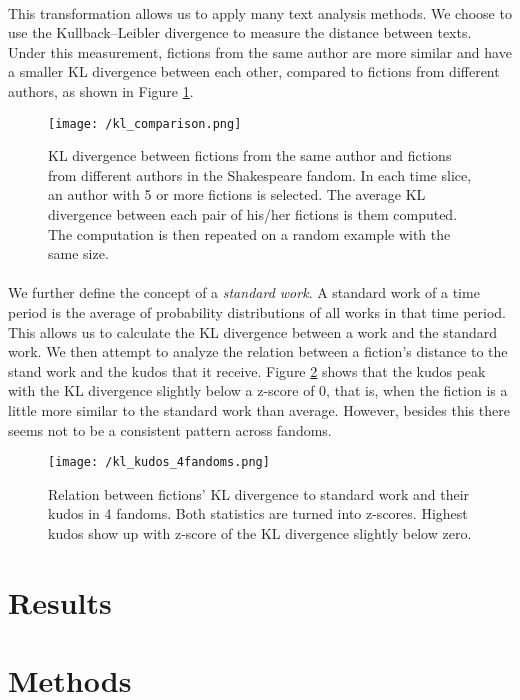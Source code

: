 \documentclass[11pt]{article} %
\begin{document}
\paragraph{} This transformation allows us to apply many text analysis methods. We choose to use the Kullback--Leibler divergence to measure the distance between texts. Under this measurement, fictions from the same author are more similar and have a smaller KL divergence between each other, compared to fictions from different authors, as shown in Figure \ref{fig:kl_comp}.


\begin{figure}[htbp]
\begin{center}
\texttt{[image: /kl\_comparison.png]}
\caption{KL divergence between fictions from the same author and fictions from different authors in the Shakespeare fandom. In each time slice, an author with 5 or more fictions is selected. The average KL divergence between each pair of his/her fictions is them computed. The computation is then repeated on a random example with the same size. }
\label{fig:kl_comp}
\end{center}
\end{figure}

\paragraph{} We further define the concept of a \emph{standard work}. A standard work of a time period is the average of probability distributions of all works in that time period. This allows us to calculate the KL divergence between a work and the standard work. We then attempt to analyze the relation between a fiction's distance to the stand work and the kudos that it receive. Figure \ref{fig:kl_kudos} shows that the kudos peak with the KL divergence slightly below a z-score of 0, that is, when the fiction is a little more similar to the standard work than average. However, besides this there seems not to be a consistent pattern across fandoms.

\begin{figure}[htbp]
\begin{center}
\texttt{[image: /kl\_kudos\_4fandoms.png]}
\caption{Relation between fictions' KL divergence to standard work and their kudos in 4 fandoms. Both statistics are turned into z-scores. Highest kudos show up with z-score of the KL divergence slightly below zero.}
\label{fig:kl_kudos}
\end{center}
\end{figure}






\section{Results} %
\label{sec:results}


\section{Methods} %
\label{sec:methods}


\printbibliography
    
\end{document}
